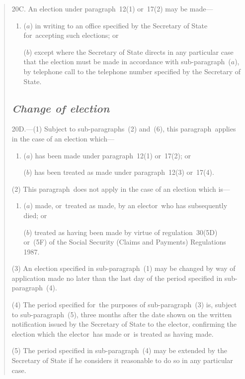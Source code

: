 \documentclass[12pt,a4paper]{article}
\begin{document}
\begin{enumerate}
\begin{quotation}
20C.  An election under paragraph~12(1) or~17(2) may be made—
\begin{enumerate}\item[]
($a$) in writing to an office specified by the Secretary of State for~accepting such elections; or

($b$) except where the Secretary of State directs in any particular case that the election must be made in accordance with sub-paragraph~($a$), by telephone call to the telephone number specified by the Secretary of State.
\end{enumerate}

\subsection*{\itshape Change of election}

20D.---(1)  Subject to sub-paragraphs~(2) and~(6), this paragraph~applies in the case of an election which—
\begin{enumerate}\item[]
($a$) has been made under paragraph~12(1) or~17(2); or

($b$) has been treated as made under paragraph~12(3) or~17(4).
\end{enumerate}

(2) This paragraph~does not apply in the case of an election which is—
\begin{enumerate}\item[]
($a$) made, or~treated as made, by an elector~who has subsequently died; or

($b$) treated as having been made by virtue of regulation~30(5D) or~(5F) of the Social Security (Claims and Payments) Regulations 1987.
\end{enumerate}

(3) An election specified in sub-paragraph~(1) may be changed by way of application made no later than the last day of the period specified in sub-paragraph~(4).

(4) The period specified for~the purposes of sub-\hspace{0pt}paragraph~(3) is, subject to sub-paragraph~(5), three months after the date shown on the written notification issued by the Secretary of State to the elector, confirming the election which the elector~has made or~is treated as having made.

(5) The period specified in sub-paragraph~(4) may be extended by the Secretary of State if he considers it reasonable to do so in any particular case.


\end{quotation}
\end{enumerate}
\end{document}

